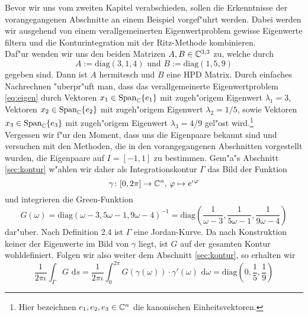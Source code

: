 Bevor wir uns vom zweiten Kapitel verabschieden, sollen die Erkenntnisse der vorangegangenen
Abschnitte an einem Beispiel vorgef"uhrt werden. Dabei werden wir ausgehend von einem
verallgemeinerten Eigenwertproblem gewisse Eigenwerte filtern und die Konturintegration
mit der Ritz-Methode kombinieren.\\

Daf"ur wenden wir uns den beiden Matrizen
$A,B \in \mathbb{C}^{3,3}$ zu, welche durch
\[
A:= \text{diag}(3,1,4)\text{ und }
B:= \text{diag}(1,5,9)
\]
gegeben sind. Dann ist $A$ hermitesch und $B$ eine HPD Matrix.
Durch einfaches Nachrechnen "uberpr"uft man, dass das
verallgemeinerte Eigenwertproblem \eqref{eq:eigen} durch Vektoren
$x_1 \in \text{Span}_{\mathbb{C}}\{e_1\}$ mit zugeh"origem Eigenwert $\lambda_1 = 3$, Vektoren
$x_2 \in \text{Span}_{\mathbb{C}}\{e_2\}$ mit zugeh"origem Eigenwert $\lambda_2 = 1/5$, sowie
Vektoren $x_3 \in\text{Span}_{\mathbb{C}}\{e_3\}$ mit zugeh"origem Eigenwert $\lambda_3 = 4/9$
gel"ost wird.\footnote{Hier bezeichnen $e_1, e_2, e_3 \in\mathbb{C}^n$ die kanonischen Einheitsvektoren.}\\

Vergessen wir f"ur den Moment, dass uns die Eigenpaare bekannt sind und versuchen
mit den Methoden, die in den vorangegangenen Abschnitten vorgestellt wurden, die Eigenpaare auf $I = [-1,1]$ zu bestimmen.
Gem"a"s Abschnitt \ref{sec:kontur} w"ahlen wir daher als Integrationskontur $\Gamma$ das Bild der Funktion
\begin{equation}\label{kurve}
\gamma\colon [0,2\pi]\to\mathbb{C}^n\text{, }\varphi\mapsto e^{\iota \varphi}
\end{equation}
und integrieren die Green-Funktion
\[
G(\omega) = \text{diag}(\omega-3, 5\omega-1, 9\omega-4)^{-1}
=\text{diag}\left(\frac{1}{\omega-3}, \frac{1}{5\omega-1}, \frac{1}{9\omega-4}\right)
\]
dar"uber.
Nach Definition 2.4 ist $\Gamma$ eine Jordan-Kurve.
Da nach Konstruktion keiner der Eigenwerte im Bild von
$\gamma$ liegt, ist $G$ auf der gesamten Kontur wohldefiniert.
Folgen wir also weiter dem Abschnitt \ref{sec:kontur}, so erhalten wir
\[
\frac{1}{2\pi\iota} \int_\Gamma G \text{ d}s =
\frac{1}{2\pi\iota}\int_0^{2\pi} G(\gamma(\omega))\cdot \gamma'(\omega)
\text{ d}\omega
= \text{diag}\left( 0, \frac{1}{5}, \frac{1}{9} \right)
\]

